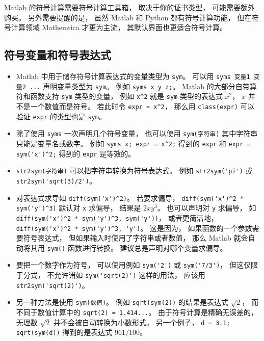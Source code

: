 

Matlab 的符号计算需要符号计算工具箱， 取决于你的证书类型， 可能需要额外购买。 另外需要提醒的是， 虽然 Matlab 和 Python 都有符号计算功能， 但在符号计算领域 Mathemtica 才更为主流， 其默认界面也更适合符号计算。

\subsection{符号变量和符号表达式}
\begin{itemize}
\item Matlab 中用于储存符号计算表达式的变量类型为 \verb|sym|。 可以用 \verb|syms 变量1 变量2 ...| 声明变量类型为 \verb|sym|。 例如 \verb|syms x y z;|。 Matlab 的大部分自带算符和函数支持 \verb|sym| 类型的变量， 例如 \verb|x^2| 就是 \verb|sym| 类型的表达式 $x^2$， $x$ 并不是一个数值而是符号。 若此时令 \verb|expr = x^2|， 那么用 \verb|class(expr)| 可以验证 \verb|expr| 的类型也是 \verb|sym|。

\item 除了使用 \verb|syms| 一次声明几个符号变量， 也可以使用 \verb|sym(字符串)| 其中字符串只能是变量名或数字。 例如 \verb|syms x; expr = x^2;| 得到的 \verb|expr| 和 \verb|expr = sym('x')^2;| 得到的 \verb|expr| 是等效的。

\item \verb|str2sym(字符串)| 可以把字符串转换为符号表达式。 例如 \verb|str2sym('pi')| 或 \verb|str2sym('sqrt(3)/2')|。

\item  对表达式求导如 \verb|diff(sym('x')^2)|。 若要求偏导， \verb|diff(sym('x')^2 * sym('y')^3)| 默认对 \verb|x| 求偏导， 结果是 $2x y^3$。 也可以声明对 \verb|y| 求偏导， 如 \verb|diff(sym('x')^2 * sym('y')^3, sym('y'))|， 或者更简洁地， \verb|diff(sym('x')^2 * sym('y')^3, 'y')|。 这是因为， 如果函数的一个参数需要符号表达式， 但如果输入时使用了字符串或者数值， 那么 Matlab 就会自动将其用 \verb|sym()| 函数进行转换。 建议总是声明对哪个变量求偏导。

\item  要把一个数字作为符号， 可以使用例如 \verb|sym('2')| 或 \verb|sym('7/3')|， 但这仅限于分式， 不允许诸如 \verb|sym('sqrt(2)')| 这样的用法， 应该用 \verb|str2sym('sqrt(2)')|。

\item 另一种方法是使用 \verb|sym(数值)|。 例如 \verb|sqrt(sym(2))| 的结果是表达式 $\sqrt 2$， 而不同于数值计算中的 \verb|sqrt(2) = 1.414...|。 由于符号计算是精确无误差的， 无理数 $\sqrt{2}$ 并不会被自动转换为小数形式。 另一个例子， \verb|d = 3.1; sqrt(sym(d))| 得到的是表达式 $961/100$。


\end{itemize}
